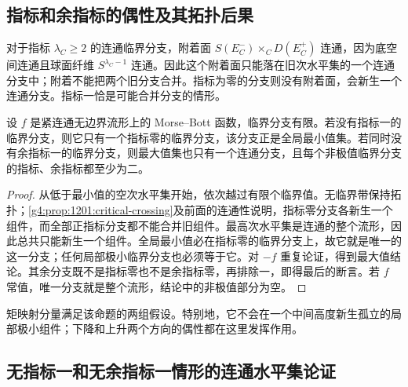 \subsection{指标和余指标的偶性及其拓扑后果}
\label{g4:subsec:1201:06}

对于指标 \(\lambda_C\geq2\) 的连通临界分支，附着面 \(S(E_C^-)\times_C D(E_C^+)\) 连通，因为底空间连通且球面纤维 \(S^{\lambda_C-1}\) 连通。因此这个附着面只能落在旧次水平集的一个连通分支中；附着不能把两个旧分支合并。指标为零的分支则没有附着面，会新生一个连通分支。指标一恰是可能合并分支的情形。

\begin{proposition}\label{g4:prop:1201:unique-extreme-components}
	设 \(f\) 是紧连通无边界流形上的 Morse–Bott 函数，临界分支有限。若没有指标一的临界分支，则它只有一个指标零的临界分支，该分支正是全局最小值集。若同时没有余指标一的临界分支，则最大值集也只有一个连通分支，且每个非极值临界分支的指标、余指标都至少为二。
\end{proposition}
\begin{proof}
	从低于最小值的空次水平集开始，依次越过有限个临界值。无临界带保持拓扑；\cref{g4:prop:1201:critical-crossing}及前面的连通性说明，指标零分支各新生一个组件，而全部正指标分支都不能合并旧组件。最高次水平集是连通的整个流形，因此总共只能新生一个组件。全局最小值必在指标零的临界分支上，故它就是唯一的这一分支；任何局部极小临界分支也必须等于它。对 \(-f\) 重复论证，得到最大值结论。其余分支既不是指标零也不是余指标零，再排除一，即得最后的断言。若 \(f\) 常值，唯一分支就是整个流形，结论中的非极值部分为空。
\end{proof}

矩映射分量满足该命题的两组假设。特别地，它不会在一个中间高度新生孤立的局部极小组件；下降和上升两个方向的偶性都在这里发挥作用。

\subsection{无指标一和无余指标一情形的连通水平集论证}
\label{g4:subsec:1201:07}

